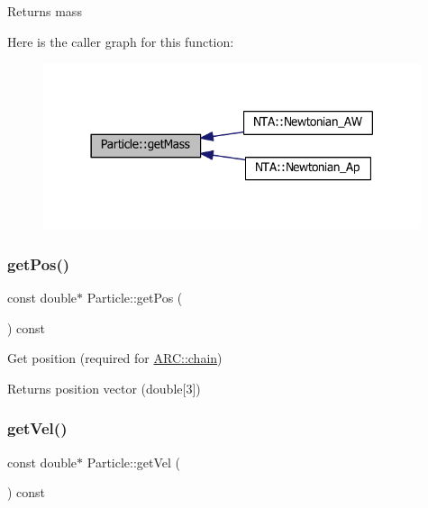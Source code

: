 \begin{DoxyReturn}{Returns}
mass 
\end{DoxyReturn}
Here is the caller graph for this function\+:
\nopagebreak
\begin{figure}[H]
\begin{center}
\leavevmode
\includegraphics[width=314pt]{classParticle_a2576aff503f68e78ced91406512b1255_icgraph}
\end{center}
\end{figure}
\hypertarget{classParticle_a4ec76421cddd91b1f27357fb182f6923}{}\label{classParticle_a4ec76421cddd91b1f27357fb182f6923} 
\subsubsection{\texorpdfstring{get\+Pos()}{getPos()}}
{\footnotesize\ttfamily const double$\ast$ Particle\+::get\+Pos (\begin{DoxyParamCaption}{ }\end{DoxyParamCaption}) const\hspace{0.3cm}{\ttfamily [inline]}}



Get position (required for \hyperlink{classARC_1_1chain}{A\+R\+C\+::chain}) 

\begin{DoxyReturn}{Returns}
position vector (double\mbox{[}3\mbox{]}) 
\end{DoxyReturn}
\hypertarget{classParticle_ab3d63df7f8c22f232b096ae33b6ea3ac}{}\label{classParticle_ab3d63df7f8c22f232b096ae33b6ea3ac} 
\subsubsection{\texorpdfstring{get\+Vel()}{getVel()}}
{\footnotesize\ttfamily const double$\ast$ Particle\+::get\+Vel (\begin{DoxyParamCaption}{ }\end{DoxyParamCaption}) const\hspace{0.3cm}{\ttfamily [inline]}}



